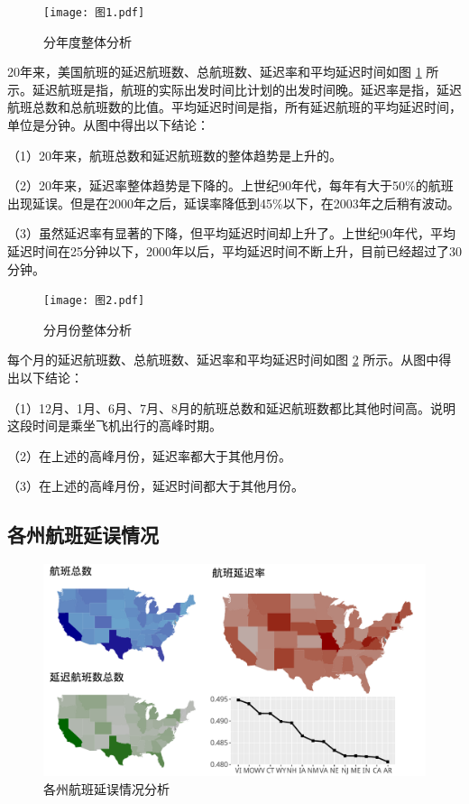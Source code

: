 \documentclass[12pt,a4paper,onecolumn]{article}
\begin{document}
\begin{figure}[H]
	\centering
	\texttt{[image: 图1.pdf]}
	\caption{分年度整体分析}
  \label{图1}
\end{figure}

20年来，美国航班的延迟航班数、总航班数、延迟率和平均延迟时间如图 \ref{图1} 所示。延迟航班是指，航班的实际出发时间比计划的出发时间晚。延迟率是指，延迟航班总数和总航班数的比值。平均延迟时间是指，所有延迟航班的平均延迟时间，单位是分钟。从图中得出以下结论：

（1）20年来，航班总数和延迟航班数的整体趋势是上升的。

（2）20年来，延迟率整体趋势是下降的。上世纪90年代，每年有大于50\%的航班出现延误。但是在2000年之后，延误率降低到45\%以下，在2003年之后稍有波动。

（3）虽然延迟率有显著的下降，但平均延迟时间却上升了。上世纪90年代，平均延迟时间在25分钟以下，2000年以后，平均延迟时间不断上升，目前已经超过了30分钟。

\begin{figure}[H]
	\centering
	\texttt{[image: 图2.pdf]}
	\caption{分月份整体分析}
	\label{图2}
\end{figure}

每个月的延迟航班数、总航班数、延迟率和平均延迟时间如图 \ref{图2} 所示。从图中得出以下结论：

（1）12月、1月、6月、7月、8月的航班总数和延迟航班数都比其他时间高。说明这段时间是乘坐飞机出行的高峰时期。

（2）在上述的高峰月份，延迟率都大于其他月份。

（3）在上述的高峰月份，延迟时间都大于其他月份。

\subsection{各州航班延误情况}

\begin{figure}[H]
	\centering
	\includegraphics[width=400pt]{图3_2008地图.pdf}
	\caption{各州航班延误情况分析}
     \label{图3_2008地图}
\end{figure}
\end{document}
